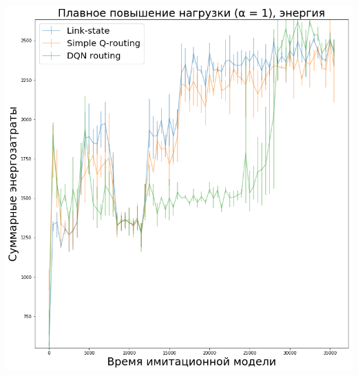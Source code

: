 \documentclass{beamer}
\begin{document}
\begin{frame}
\begin{columns}
\begin{column}{0.5\textwidth}
      \includegraphics[width=\textwidth]{experiment-conveyors-a1-energy-tall}
    \end{column}
  \end{columns}
\end{frame}

\end{document}
